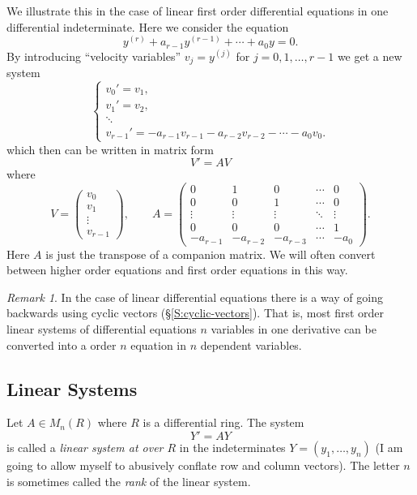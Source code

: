 \documentclass[12pt]{book}
\numberwithin{equation}{section}
\theoremstyle{definition}
\theoremstyle{remark}
\newtheorem{remark}[theorem]{Remark}
\begin{document}
We illustrate this in the case of linear first order differential equations in one differential indeterminate. 
Here we consider the equation
 $$ y^{(r)} + a_{r-1} y^{(r-1)} + \cdots + a_0 y =0. $$
By introducing ``velocity variables'' $v_j = y^{(j)}$ for $j=0,1,\ldots, r-1$ we get a new system
$$\begin{cases}
	v_0' = v_1, \\
	v_1' = v_2 ,\\
	\ddots \\
	v_{r-1}' = -a_{r-1}v_{r-1} - a_{r-2} v_{r-2} - \cdots - a_0 v_0 .
\end{cases}$$
which then can be written in matrix form 
 $$ V' = AV $$
where 
 $$ V = \begin{pmatrix}v_0 \\
 v_1 \\
 \vdots \\
 v_{r-1} 
 \end{pmatrix}, \qquad A = \begin{pmatrix}
 0 & 1 & 0  & \cdots & 0 \\
 0 & 0 & 1 & \cdots & 0 \\
 \vdots & \vdots & \vdots & \ddots & \vdots \\
 0 & 0 & 0 & \cdots & 1 \\
 -a_{r-1} & -a_{r-2} & -a_{r-3} & \cdots & -a_0
 \end{pmatrix}.
 $$
Here $A$ is just the transpose of a companion matrix. 
We will often convert between higher order equations and first order equations in this way. 

\begin{remark}
	In the case of linear differential equations there is a way of going backwards using cyclic vectors (\S\ref{S:cyclic-vectors}). 
	That is, most first order linear systems of differential equations  $n$ variables in one derivative can be converted into a order $n$ equation in $n$ dependent variables. 
\end{remark}

\subsection{Linear Systems}
Let $A \in M_n(R)$ where $R$ is a differential ring.  
The system 
\begin{equation}
Y' = A Y
\end{equation}
 is called a \emph{linear system at over $R$} in the indeterminates $Y=(y_1,\ldots,y_n)$ (I am going to allow myself to abusively conflate row and column vectors). 
 The letter $n$ is sometimes called the \emph{rank} of the linear system. 
 
\end{document}
